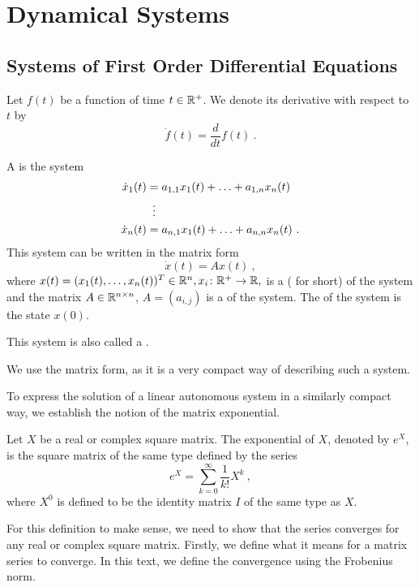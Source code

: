 \chapter{Dynamical Systems}
\label{chap:intr}

\section{Systems of First Order Differential Equations}

\begin{remark}
	Let $f(t)$ be a function of time $t\in\mathbb{R}^+$. We denote its derivative with respect to $t$ by $$\dot{f}(t)=\frac{d}{dt}f(t)\ .$$
\end{remark}

\begin{definition}
	A  is the system 
	\begin{align*}
		\dot{x}_1(t)&=a_{1,1}x_1(t)+\ldots+a_{1,n}x_n(t) \\
		&\vdotswithin{=} \\
		\dot{x}_n(t)&=a_{n,1}x_1(t)+\ldots+a_{n,n}x_n(t)\ .
	\end{align*}
	This system can be written in the matrix form $$\dot{x}(t)=Ax(t)\ ,$$ where $x(t)=(x_1(t),\ldots,x_n(t))^T \in \mathbb{R}^n, x_i\colon\mathbb{R}^+\to\mathbb{R},$ is a  ( for short) of the system and the matrix $A\in \mathbb{R}^{n\times n}$, $A=(a_{i,j})$ is a  of the system. The  of the system is the state $x(0)$.

	This system is also called a .
\end{definition}

We use the matrix form, as it is a very compact way of describing such a system.

To express the solution of a linear autonomous system in a similarly compact way, we establish the notion of the matrix exponential.

\begin{definition}
	Let $X$ be a real or complex square matrix. The exponential of $X$, denoted by $e^X$, is the square matrix of the same type defined by the series $$e^{X}=\sum _{k=0}^{\infty}\frac{1}{k!}X^{k}\ ,$$
	where $X^0$ is defined to be the identity matrix $I$ of the same type as $X$.
\end{definition}

For this definition to make sense, we need to show that the series converges for any real or complex square matrix. Firstly, we define what it means for a matrix series to converge. In this text, we define the convergence using the Frobenius norm.

